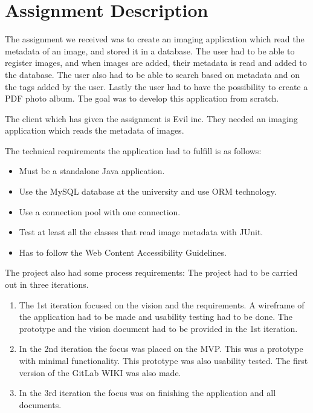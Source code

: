 \section{Assignment Description}
The assignment we received was to create an imaging application which read the metadata of an image, and stored it in a database. 
The user had to be able to register images, and when images are added, their metadata is read and added to the database. The user also had to be able to search based on metadata and on the tags added by the user. Lastly the user had to have the possibility to create a PDF photo album.
The goal was to develop this application from scratch.

The client which has given the assignment is Evil inc. They needed an imaging application which reads the metadata of images. 

The technical requirements the application had to fulfill is as follows:
\begin{itemize}
    \item Must be a standalone Java application.
    \item Use the MySQL database at the university and use ORM technology.
    \item Use a connection pool with one connection.
    \item Test at least all the classes that read image metadata with JUnit.
    \item Has to follow the Web Content Accessibility Guidelines.
\end{itemize}

The project also had some process requirements:
The project had to be carried out in three iterations.
\begin{enumerate}
    \item The 1st iteration focused on the vision and the requirements. A wireframe of the application had to be made and usability testing had to be done. The prototype and the vision document had to be provided in the 1st iteration.
    \item In the 2nd iteration the focus was placed on the MVP. This was a prototype with minimal functionality. This prototype was also usability tested. The first version of the GitLab WIKI was also made.
    \item In the 3rd iteration the focus was on finishing the application and all documents. 
\end{enumerate}
